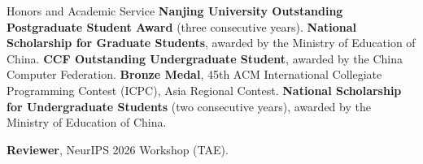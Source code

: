 \begin{rubric}{Honors and Academic Service}
\entry*[2023--2025] \textbf{Nanjing University Outstanding Postgraduate Student Award} (three consecutive years).
\entry*[2023] \textbf{National Scholarship for Graduate Students}, awarded by the Ministry of Education of China.
\entry*[2021] \textbf{CCF Outstanding Undergraduate Student}, awarded by the China Computer Federation.
\entry*[2021] \textbf{Bronze Medal}, 45th ACM International Collegiate Programming Contest (ICPC), Asia Regional Contest.
\entry*[2020--2021] \textbf{National Scholarship for Undergraduate Students} (two consecutive years), awarded by the Ministry of Education of China.

\entry*[2026] \textbf{Reviewer}, NeurIPS 2026 Workshop (TAE).
\end{rubric}
